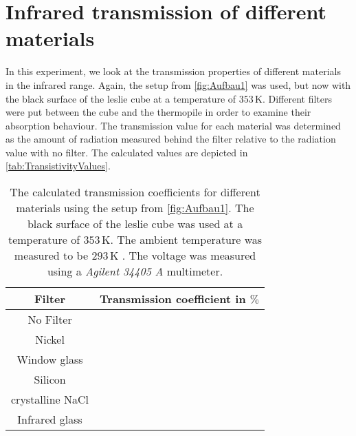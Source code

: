 \documentclass[a4paper,10pt,twocolumn]{article}
\begin{document}
    \section{Infrared transmission of different materials}\label{sec:Transmission}
    In this experiment, we look at the transmission properties of different materials in the infrared range.
    Again, the setup from \autoref{fig:Aufbau1} was used, but now with the black surface of the leslie cube at a temperature of $353\,$K.
    Different filters were put between the cube and the thermopile in order to examine their absorption behaviour.
    The transmission value for each material was determined as the amount of radiation measured behind the filter relative to the radiation value with no filter.
    The calculated values are depicted in \autoref{tab:TransistivityValues}.
    \begin{table}[htbp]          %
        \centering
        \begin{tabular*}{0.9\linewidth}{@{\extracolsep{\fill}}cc}
            \hline
            \hline
            \rule[-7pt]{0pt}{23pt}  Filter  &  Transmission coefficient in $\%$	 \\
            \hline
            \rule[-5pt]{0pt}{23pt}   No Filter  &   \TransistivityValue 	 \\
            \rule[-5pt]{0pt}{23pt}   Nickel   & \TransistivityValueOne    	 \\
            \rule[-5pt]{0pt}{23pt}   Window glass  &   \TransistivityValueTwo	 \\
            \rule[-5pt]{0pt}{23pt}   Silicon  &   \TransistivityValueThree  	 \\
            \rule[-5pt]{0pt}{23pt}   crystalline NaCl &   \TransistivityValueFour 	 \\
            \rule[-5pt]{0pt}{23pt}   Infrared glass  &   \TransistivityValueFive	 \\
            \hline
            \hline
        \end{tabular*}
        \normalsize
        \caption[]{The calculated transmission coefficients for different materials using the setup from \autoref{fig:Aufbau1}.
        The black surface of the leslie cube was used at a temperature of $353\,$K. The ambient temperature was measured to be $293\,$K .
        The voltage was measured using a \textit{Agilent 34405 A} multimeter.}  %
        \label{tab:TransistivityValues}                             %
    \end{table}
\end{document}
